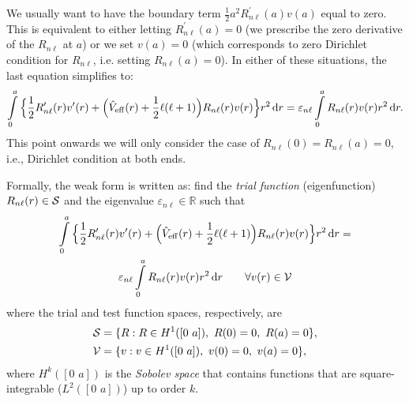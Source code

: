 \documentclass[12pt,dvipsnames]{article}
\begin{document}
We usually want to have the boundary term $\frac{1}{2} a^2 R^\prime_{n \ell}(a) v(a)$ equal to zero. This is equivalent to either letting 
$R^\prime_{n \ell}(a) = 0$ (we prescribe the zero derivative of the $R_{n \ell}$ at $a$) or we set $v(a) = 0$ (which corresponds to zero 
Dirichlet condition for $R_{n \ell}$, i.e. setting $R_{n \ell}(a) = 0$).
In either of these situations, the last equation simplifies to: %
\begin{equation}	\nonumber
\int\limits_{0}^a \Big\{ \frac{1}{2} R^\prime_{n \ell}(r) v^\prime(r) + \Big( \hat{V}_{\rm{eff}}(r) + \frac{1}{2}\ell(\ell + 1) \Big ) R_{n \ell}(r) v(r) \Big\} r^2 \, \mathrm{d} r  
= \varepsilon_{n \ell} \int\limits_{0}^a R_{n \ell} (r) v(r) r^2 \, \mathrm{d} r.
\end{equation}
This point onwards we will only consider the case of $R_{n \ell}(0) = R_{n \ell}(a) = 0$, i.e., 
Dirichlet condition at both ends.

\noindent
Formally, the weak form is written as: find the \emph{trial function} (eigenfunction) 
$R_{n \ell}(r) \in {\cal S}$ and the eigenvalue $\varepsilon_{n \ell} \in \mathbb{R}$
such that
\begin{multline} \label{weakks}
\int\limits_{0}^a \Big\{ \frac{1}{2} R^\prime_{n \ell}(r) v^\prime(r) + \Big( \hat{V}_{\rm{eff}}(r) + \frac{1}{2}\ell(\ell + 1) \Big ) 
R_{n \ell}(r) v(r) \Big\} r^2 \, \mathrm{d} r  = \\
\varepsilon_{n \ell} \int\limits_{0}^a R_{n \ell} (r) v(r) r^2 \, \mathrm{d} r \qquad \forall v(r) \in {\cal V}
\end{multline}
where the trial and test function spaces, respectively, are
\begin{align*}
{\cal S} &= \{ R: R \in H^1([0 \, \, a]), \ R(0) = 0, \ R(a) = 0 \}, \\
{\cal V} &= \{ v: v \in H^1([0 \, \, a]), \ v(0) = 0, \ v(a) = 0 \},
\end{align*}
where $H^k([0 \, \, a])$ is the \emph{Sobolev space} that contains
functions that are square-integrable ($L^2([0 \, \, a])$) up to order $k$.
%
\end{document}
